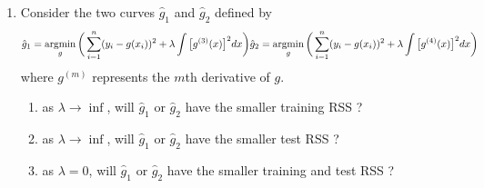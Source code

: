 \documentclass[../statistical_learning_notes.tex]{subfiles}
\begin{document}
\begin{enumerate}
        \item Consider the two curves $\hat{g}_{1}$ and $\hat{g}_{2}$ defined by
        \begin{align*}
            \hat{g}_{1} = \operatorname*{argmin}_{g} \bigg( \sum_{i=1}^{n}(y_{i} - g(x_{i}))^{2} + \lambda \int \big[ g^{(3)}(x) \big]^{2} dx \bigg)
            \hat{g}_{2} = \operatorname*{argmin}_{g} \bigg( \sum_{i=1}^{n}(y_{i} - g(x_{i}))^{2} + \lambda \int \big[ g^{(4)}(x) \big]^{2} dx \bigg)
        \end{align*}
        where $g^{(m)}$ represents the $m$th derivative of $g$.
        \begin{enumerate}
            \item as $\lambda \to \inf$, will $\hat{g}_{1}$ or $\hat{g}_{2}$ have the smaller training RSS ?
            \item as $\lambda \to \inf$, will $\hat{g}_{1}$ or $\hat{g}_{2}$ have the smaller test RSS ?
            \item as $\lambda = 0$, will $\hat{g}_{1}$ or $\hat{g}_{2}$ have the smaller training and test RSS ?
        \end{enumerate}
    \end{enumerate}


\end{document}
